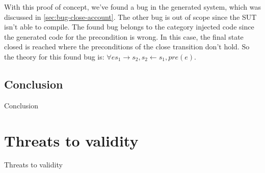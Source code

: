 With this proof of concept, we've found a bug in the generated system, which was
discussed in \autoref{sec:bug-close-account}. The other bug is out of scope
since the SUT isn't able to compile. The found bug belongs to the category
injected code since the generated code for the precondition is wrong. In this
case, the final state closed is reached where the preconditions of the close
transition don't hold. So the theory for this found bug is:
$\forall e s_{1} \to s_{2}, s_{2} \gets s_{1}, pre(e)$.




\subsection{Conclusion}
Conclusion

\section{Threats to validity}
Threats to validity
